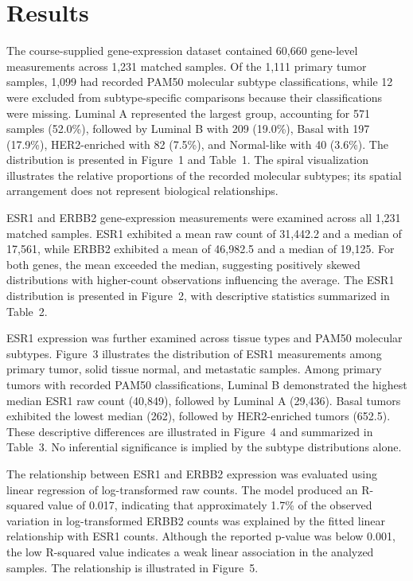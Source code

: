 \documentclass[12pt,letterpaper]{article}
\begin{document}
\section*{Results}

The course-supplied gene-expression dataset contained 60,660 gene-level measurements across 1,231 matched samples. Of the 1,111 primary tumor samples, 1,099 had recorded PAM50 molecular subtype classifications, while 12 were excluded from subtype-specific comparisons because their classifications were missing. Luminal A represented the largest group, accounting for 571 samples (52.0\%), followed by Luminal B with 209 (19.0\%), Basal with 197 (17.9\%), HER2-enriched with 82 (7.5\%), and Normal-like with 40 (3.6\%). The distribution is presented in Figure~1 and Table~1. The spiral visualization illustrates the relative proportions of the recorded molecular subtypes; its spatial arrangement does not represent biological relationships.

ESR1 and ERBB2 gene-expression measurements were examined across all 1,231 matched samples. ESR1 exhibited a mean raw count of 31,442.2 and a median of 17,561, while ERBB2 exhibited a mean of 46,982.5 and a median of 19,125. For both genes, the mean exceeded the median, suggesting positively skewed distributions with higher-count observations influencing the average. The ESR1 distribution is presented in Figure~2, with descriptive statistics summarized in Table~2.

ESR1 expression was further examined across tissue types and PAM50 molecular subtypes. Figure~3 illustrates the distribution of ESR1 measurements among primary tumor, solid tissue normal, and metastatic samples. Among primary tumors with recorded PAM50 classifications, Luminal B demonstrated the highest median ESR1 raw count (40,849), followed by Luminal A (29,436). Basal tumors exhibited the lowest median (262), followed by HER2-enriched tumors (652.5). These descriptive differences are illustrated in Figure~4 and summarized in Table~3. No inferential significance is implied by the subtype distributions alone.

The relationship between ESR1 and ERBB2 expression was evaluated using linear regression of log-transformed raw counts. The model produced an R-squared value of 0.017, indicating that approximately 1.7\% of the observed variation in log-transformed ERBB2 counts was explained by the fitted linear relationship with ESR1 counts. Although the reported p-value was below 0.001, the low R-squared value indicates a weak linear association in the analyzed samples. The relationship is illustrated in Figure~5.
\end{document}
